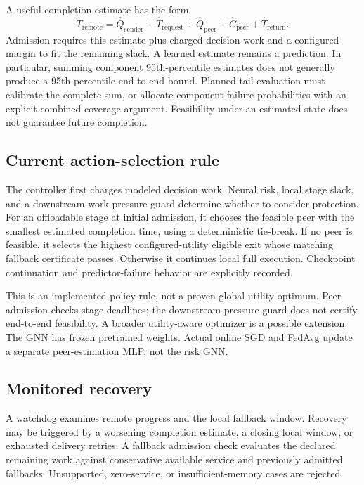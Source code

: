\documentclass[11pt,a4paper]{article}
\begin{document}
A useful completion estimate has the form
\begin{equation}
 \widehat T_{\mathrm{remote}}=
 \widehat Q_{\mathrm{sender}}+\widehat T_{\mathrm{request}}+
 \widehat Q_{\mathrm{peer}}+\widehat C_{\mathrm{peer}}+
 \widehat T_{\mathrm{return}}.
\end{equation}
Admission requires this estimate plus charged decision work and a configured
margin to fit the remaining slack. A learned estimate remains a prediction.
In particular, summing component 95th-percentile estimates does not generally
produce a 95th-percentile end-to-end bound. Planned tail evaluation must calibrate
the complete sum, or allocate component failure probabilities with an explicit
combined coverage argument. Feasibility under an estimated state does not
guarantee future completion.

\subsection{Current action-selection rule}
The controller first charges modeled decision work. Neural risk, local stage
slack, and a downstream-work pressure guard determine whether to consider
protection. For an offloadable stage at initial admission, it chooses the
feasible peer with the smallest estimated completion time, using a deterministic
tie-break. If no peer is feasible, it selects the highest configured-utility
eligible exit whose matching fallback certificate passes. Otherwise it continues
local full execution. Checkpoint continuation and predictor-failure behavior
are explicitly recorded.

This is an implemented policy rule, not a proven global utility optimum. Peer
admission checks stage deadlines; the downstream pressure guard does not certify
end-to-end feasibility. A broader utility-aware optimizer is a possible extension.
The GNN has frozen pretrained weights. Actual online SGD and FedAvg update a
separate peer-estimation MLP, not the risk GNN.

\subsection{Monitored recovery}
A watchdog examines remote progress and the local fallback window. Recovery may
be triggered by a worsening completion estimate, a closing local window, or
exhausted delivery retries. A fallback admission check evaluates the declared
remaining work against conservative available service and previously admitted
fallbacks. Unsupported, zero-service, or insufficient-memory cases are rejected.
\end{document}
